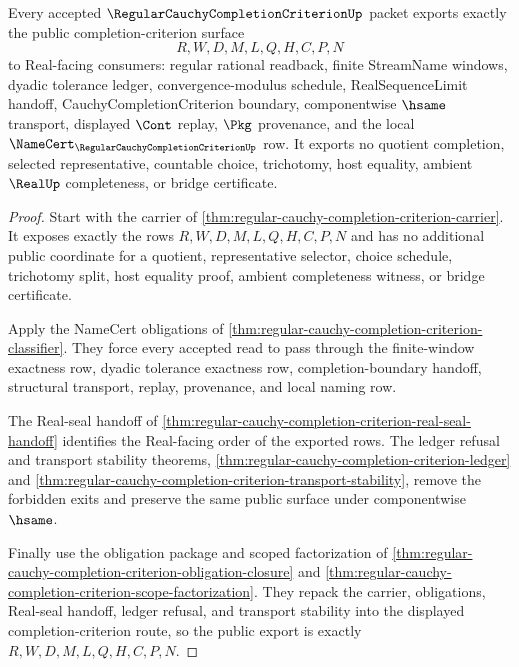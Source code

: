 \begin{theorem}
\label{thm:regular-cauchy-completion-criterion-public-export}
Every accepted $\RegularCauchyCompletionCriterionUp$ packet exports exactly the public completion-criterion surface
$$
R,W,D,M,L,Q,H,C,P,N
$$
to Real-facing consumers: regular rational readback, finite StreamName windows, dyadic tolerance ledger, convergence-modulus schedule, RealSequenceLimit handoff, CauchyCompletionCriterion boundary, componentwise $\hsame$ transport, displayed $\Cont$ replay, $\Pkg$ provenance, and the local $\NameCert_{\RegularCauchyCompletionCriterionUp}$ row. It exports no quotient completion, selected representative, countable choice, trichotomy, host equality, ambient $\RealUp$ completeness, or bridge certificate.
\end{theorem}
\begin{proof}
Start with the carrier of \autoref{thm:regular-cauchy-completion-criterion-carrier}. It exposes exactly the rows $R,W,D,M,L,Q,H,C,P,N$ and has no additional public coordinate for a quotient, representative selector, choice schedule, trichotomy split, host equality proof, ambient completeness witness, or bridge certificate.

Apply the NameCert obligations of \autoref{thm:regular-cauchy-completion-criterion-classifier}. They force every accepted read to pass through the finite-window exactness row, dyadic tolerance exactness row, completion-boundary handoff, structural transport, replay, provenance, and local naming row.

The Real-seal handoff of \autoref{thm:regular-cauchy-completion-criterion-real-seal-handoff} identifies the Real-facing order of the exported rows. The ledger refusal and transport stability theorems, \autoref{thm:regular-cauchy-completion-criterion-ledger} and \autoref{thm:regular-cauchy-completion-criterion-transport-stability}, remove the forbidden exits and preserve the same public surface under componentwise $\hsame$.

Finally use the obligation package and scoped factorization of \autoref{thm:regular-cauchy-completion-criterion-obligation-closure} and \autoref{thm:regular-cauchy-completion-criterion-scope-factorization}. They repack the carrier, obligations, Real-seal handoff, ledger refusal, and transport stability into the displayed completion-criterion route, so the public export is exactly $R,W,D,M,L,Q,H,C,P,N$.
\end{proof}

